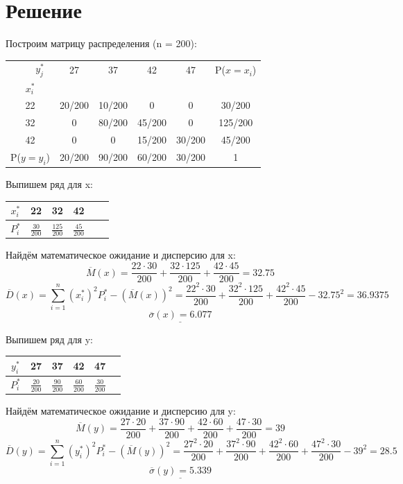 \documentclass{article}
\begin{document}
\section*{Решение}
Построим матрицу распределения (n = 200):
\begin{table}[H]
    \centering
    \begin{tabular}{|c|c|c|c|c|c|}
    \hline
     \ \ \ \ $y_j^*$&  27&  37&  42& 47& P($x=x_i$)\\
    $x_i^*$&  &  &  & &\\
    \hline
    22&  20/200&  10/200&  0& 0& 30/200\\
    \hline
    32&  0&  80/200&  45/200& 0& 125/200\\
    \hline
    42&  0&  0&  15/200& 30/200& 45/200\\
    \hline
    P($y=y_i$)&  20/200&  90/200& 60/200& 30/200& 1\\
    \hline
    \end{tabular}
\end{table}
Выпишем ряд для x:
\begin{table}[H]
    \centering
    \begin{tabular}{|c|c|c|c|c|c|}
    \hline
    $x_i^*$&  22&  32& 42\\
    \hline
    $P_i^*$& $\frac{30}{200}$&  $\frac{125}{200}$& $\frac{45}{200}$\\
    \hline
    \end{tabular}
\end{table}
Найдём математическое ожидание и дисперсию для x:
\[\overline{M}(x) = \frac{22\cdot 30}{200}+ \frac{32\cdot 125}{200} + \frac{42\cdot 45}{200} = 32.75\]
\[\overline{D}(x) = \sum_{i=1}^{n}(x_i^*)^2P_i^*-(\overline{M}(x))^2 = \frac{22^2\cdot 30}{200}+ \frac{32^2\cdot 125}{200} + \frac{42^2\cdot 45}{200} - 32.75^2 = 36.9375\]
\[\underline{\overline{\sigma}(x) = 6.077}\]

Выпишем ряд для y:
\begin{table}[H]
    \centering
    \begin{tabular}{|c|c|c|c|c|c|}
    \hline
    $y_i^*$&  27&  37& 42& 47\\
    \hline
    $P_i^*$& $\frac{20}{200}$&  $\frac{90}{200}$& $\frac{60}{200}$& $\frac{30}{200}$\\
    \hline
    \end{tabular}
\end{table}

Найдём математическое ожидание и дисперсию для y:
\[\overline{M}(y) = \frac{27\cdot 20}{200}+ \frac{37\cdot 90}{200} + \frac{42\cdot 60}{200} + \frac{47\cdot 30}{200} = 39\]
\[\overline{D}(y) = \sum_{i=1}^{n}(y_i^*)^2P_i^*-(\overline{M}(y))^2 = \frac{27^2\cdot 20}{200}+ \frac{37^2\cdot 90}{200} + \frac{42^2\cdot 60}{200} + \frac{47^2\cdot 30}{200} - 39^2 = 28.5\]
\[\underline{\overline{\sigma}(y) = 5.339}\]
\end{document}
